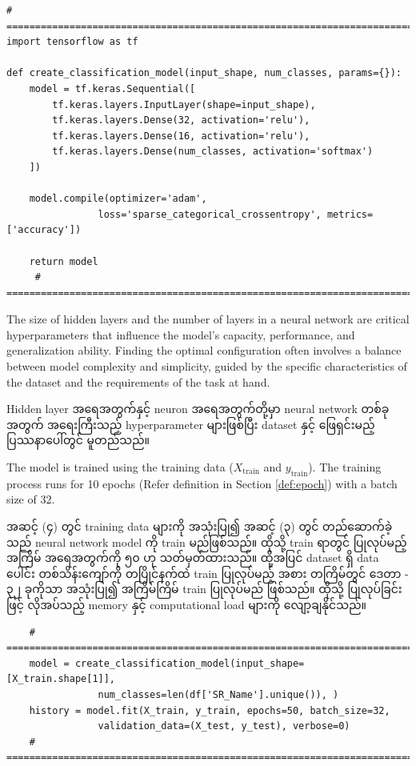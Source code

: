 \begin{lstlisting}
# =========================================================================#
import tensorflow as tf

def create_classification_model(input_shape, num_classes, params={}):
    model = tf.keras.Sequential([
        tf.keras.layers.InputLayer(shape=input_shape),
        tf.keras.layers.Dense(32, activation='relu'),
        tf.keras.layers.Dense(16, activation='relu'),
        tf.keras.layers.Dense(num_classes, activation='softmax')
    ])

    model.compile(optimizer='adam', 
                loss='sparse_categorical_crossentropy', metrics=['accuracy'])
    
    return model
     # =========================================================================#
\end{lstlisting}   
\begin{remark}
The size of hidden layers and the number of layers in a neural network are critical hyperparameters that influence the model's capacity, performance, and generalization ability. Finding the optimal configuration often involves a balance between model complexity and simplicity, guided by the specific characteristics of the dataset and the requirements of the task at hand. 

Hidden layer အရေအတွက်နှင့် neuron အရေအတွက်တို့မှာ neural network  တစ်ခုအတွက် အရေးကြီးသည့် hyperparameter များဖြစ်ပြီး dataset နှင့် ဖြေရှင်းမည့် ပြဿနာပေါ်တွင် မူတည်သည်။ 

\end{remark}
\begin{step}
The model is trained using the training data  (\(X_{\text{train}}\) and \(y_{\text{train}}\)). The training process runs for 10 epochs (Refer definition in Section \ref{def:epoch}) with a batch size of 32. 

အဆင့် (၄) တွင် training data များကို အသုံးပြု၍ အဆင့် (၃) တွင် တည်ဆောက်ခဲ့သည် neural network model ကို  train မည်ဖြစ်သည်။ ထိုသို့ train ရာတွင် ပြုလုပ်မည့် အကြိမ် အရေအတွက်ကို ၅၀ ဟု သတ်မှတ်ထားသည်။ ထို့အပြင် dataset ရှိ  data ပေါင်း တစ်သိန်းကျော်ကို တပြိုင်နက်ထဲ train ပြုလုပ်မည့် အစား တကြိမ်တွင် ဒေတာ - ၃၂ ခုကိုသာ အသုံးပြု၍  အကြိမ်ကြိမ် train ပြုလုပ်မည် ဖြစ်သည်။ ထိုသို့ ပြုလုပ်ခြင်းဖြင့် လိုအပ်သည့် memory နှင့် computational load  များကို လျော့ချနိုင်သည်။ 
    
\begin{lstlisting}
    # =========================================================================#
    model = create_classification_model(input_shape=[X_train.shape[1]],
                num_classes=len(df['SR_Name'].unique()), )
    history = model.fit(X_train, y_train, epochs=50, batch_size=32, 
                validation_data=(X_test, y_test), verbose=0)
    # =========================================================================#
\end{lstlisting}
\end{step}
